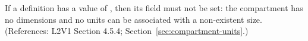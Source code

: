 If a \Compartment definition has a  value of
, then its  field must not be set: the compartment has
no dimensions and no units can be associated with a non-existent size.
(References: L2V1 Section 4.5.4; Section~\ref{sec:compartment-units}.)
